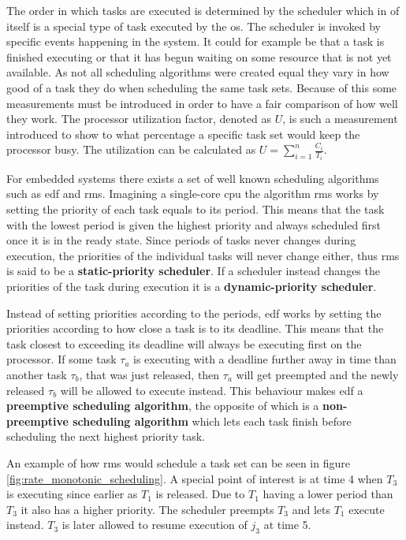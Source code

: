 \documentclass{kththesis}
\begin{document}
The order in which tasks are executed is determined by the scheduler which in of itself is a special
type of task executed by the \acrshort{os}. The scheduler is invoked by specific events happening in
the system. It could for example be that a task is finished executing or that it has begun waiting
on some resource that is not yet available. As not all scheduling algorithms were created equal they
vary in how good of a task they do when scheduling the same task sets. Because of this some
measurements must be introduced in order to have a fair comparison of how well they work. The
processor utilization factor, denoted as $ U $, is such a measurement introduced to show to what
percentage a specific task set would keep the processor busy. The utilization can be calculated as
$ U = \sum_{i=1}^n \frac{C_i}{T_i} $.

For embedded systems there exists a set of well known scheduling algorithms such as \acrshort{edf}
and \acrshort{rms}. Imagining a single-core \acrshort{cpu} the algorithm \acrshort{rms} works by
setting the priority of each task equals to its period. This means that the task with the lowest
period is given the highest priority and always scheduled first once it is in the ready state. Since
periods of tasks never changes during execution, the priorities of the individual tasks will never
change either, thus \acrshort{rms} is said to be a \textbf{static-priority scheduler}. If a
scheduler instead changes the priorities of the task during execution it is a
\textbf{dynamic-priority scheduler}. 

Instead of setting priorities according to the periods, \acrshort{edf} works by setting the
priorities according to how close a task is to its deadline. This means that the task closest to
exceeding its deadline will always be executing first on the processor. If some task $ \tau_a $ is
executing with a deadline further away in time than another task $ \tau_b $, that was just released,
then $ \tau_a $ will get preempted and the newly released $ \tau_b $ will be allowed to execute
instead. This behaviour makes \acrshort{edf} a \textbf{preemptive scheduling algorithm}, the
opposite of which is a \textbf{non-preemptive scheduling algorithm} which lets each task finish
before scheduling the next highest priority task.

An example of how \acrshort{rms} would schedule a task set can be seen in figure
\ref{fig:rate_monotonic_scheduling}. A special point of interest is at time 4 when $T_3$ is
executing since earlier as $T_1$ is released. Due to $T_1$ having a lower period than $T_3$ it also
has a higher priority. The scheduler preempts $T_3$ and lets $T_1$ execute instead. $T_3$ is later
allowed to resume execution of $j_3$ at time 5.
\end{document}
